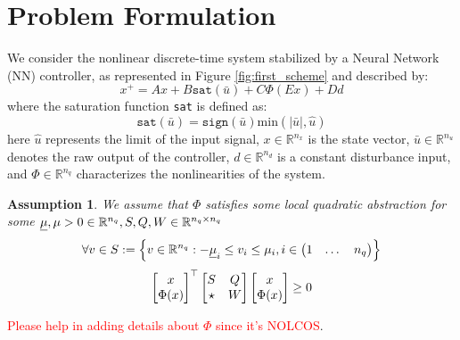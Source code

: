 \documentclass{ifacconf}
\theoremstyle{plain}
\newtheorem{assumption}{Assumption}
\begin{document}
\section{Problem Formulation}
We consider the nonlinear discrete-time system stabilized by a Neural Network (NN) controller, as represented in Figure \ref{fig:first_scheme} and described by:
\begin{equation}
  x^{+} = A x + B \texttt{sat}(\bar{u}) + C \Phi(E x) + D d 
\end{equation}
where the saturation function \texttt{sat} is defined as:
$$
    \texttt{sat}(\bar{u}) = \texttt{sign}(\bar{u})\text{min}(|\bar{u}|, \widehat{u})
$$
here $\widehat{u}$ represents the limit of the input signal, $x \in \mathbb{R}^{n_x}$ is the state vector, $\bar{u} \in \mathbb{R}^{n_u}$ denotes the raw output of the controller, $d \in \mathbb{R}^{n_d}$ is a constant disturbance input, and $\Phi \in \mathbb{R}^{n_q}$ characterizes the nonlinearities of the system.
\begin{assumption}\label{ass:nonlin}
We assume that $\Phi$ satisfies some local quadratic abstraction for some $\underline{\mu}, \relax{\mu} > 0 \in {\mathbb{R}}^{n_q}, \relax{S}, \relax{Q}, \relax{W} \in {\mathbb{R}}^{n_q \times n_q}$
\begin{equation}\label{eqn:nonlin-set}
\forall v \in \relax{S} := \left\{ v \in  {\mathbb{R}}^{n_q} : - \underline{\mu}_i \leq v_i \leq \relax{\mu}_i, i \in \left(\begin{matrix}1 & \dots & n_q\end{matrix}\right) \right\} 
\end{equation}
\begin{equation}\label{eqn:nonlin-inclusion}
\left[\begin{matrix}x \\ \Phi(x)\end{matrix}\right]^\top \left[\begin{matrix}\relax{S} & \relax{Q} \\ \star & \relax{W}\end{matrix}\right] \left[\begin{matrix}x \\ \Phi(x)\end{matrix}\right] \geq 0
\end{equation}
\end{assumption}\textcolor{red}{Please help in adding details about $\Phi$ since it's NOLCOS}.
\end{document}
